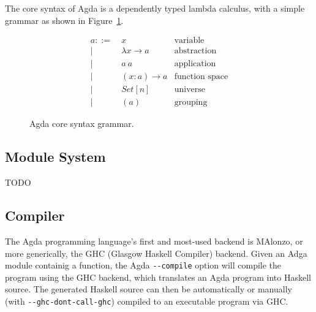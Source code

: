 



The core syntax of Agda is a dependently typed lambda calculus, with a simple grammar as shown in Figure~\ref{fig:grammar}.

\begin{figure}
\begin{align*}
a ::=~& x               & \text{variable}\\
    |~& \lambda x \to a & \text{abstraction}\\
    |~& a~a             & \text{application}\\
    |~& (x : a) \to a   & \text{function space}\\
    |~& Set[n]          & \text{universe}\\
    |~& (a)             & \text{grouping}
\end{align*}
\caption{Agda core syntax grammar.\cite{agdawiki}}
\label{fig:grammar}
\end{figure}

\subsection{Module System}

TODO

\subsection{Compiler}
\label{sec:agda_compiler}

The Agda programming language's first and most-used backend is MAlonzo, or more generically, the GHC (Glasgow Haskell Compiler) backend.\cite{benke2007} Given an Adga module containig a  function, the Agda \texttt{-{}-compile} option will compile the program using the GHC backend, which translates an Agda program into Haskell source. The generated Haskell source can then be automatically or manually (with \texttt{-{}-ghc-dont-call-ghc}) compiled to an executable program via GHC.\cite{agdadocs} %

